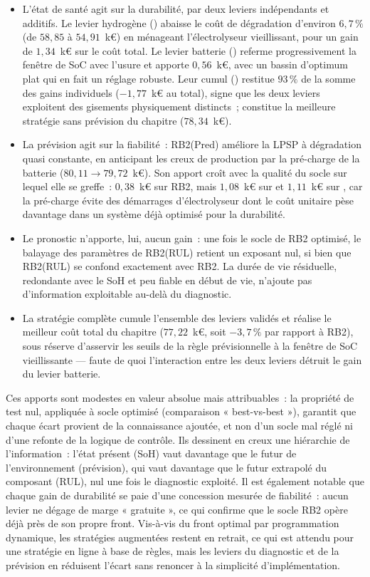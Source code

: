 \begin{itemize}
  \setlength\itemsep{2pt}
  \item L'état de santé agit sur la durabilité, par deux leviers indépendants et additifs. Le levier hydrogène (\RBsohH) abaisse le coût de dégradation d'environ $6{,}7\,\%$ (de $58{,}85$ à $54{,}91$~k€) en ménageant l'électrolyseur vieillissant, pour un gain de $1{,}34$~k€ sur le coût total. Le levier batterie (\RBsohB) referme progressivement la fenêtre de SoC avec l'usure et apporte $0{,}56$~k€, avec un bassin d'optimum plat qui en fait un réglage robuste. Leur cumul (\RBsohA) restitue $93\,\%$ de la somme des gains individuels ($-1{,}77$~k€ au total), signe que les deux leviers exploitent des gisements physiquement distincts~; \RBsohA{} constitue la meilleure stratégie sans prévision du chapitre ($78{,}34$~k€).
  \item La prévision agit sur la fiabilité~: RB2(Pred) améliore la LPSP à dégradation quasi constante, en anticipant les creux de production par la pré-charge de la batterie ($80{,}11 \to 79{,}72$~k€). Son apport croît avec la qualité du socle sur lequel elle se greffe~: $0{,}38$~k€ sur RB2, mais $1{,}08$~k€ sur \RBsohH{} et $1{,}11$~k€ sur \RBsohA, car la pré-charge évite des démarrages d'électrolyseur dont le coût unitaire pèse davantage dans un système déjà optimisé pour la durabilité.
  \item Le pronostic n'apporte, lui, aucun gain~: une fois le socle de RB2 optimisé, le balayage des paramètres de RB2(RUL) retient un exposant nul, si bien que RB2(RUL) se confond exactement avec RB2. La durée de vie résiduelle, redondante avec le SoH et peu fiable en début de vie, n'ajoute pas d'information exploitable au-delà du diagnostic.
  \item La stratégie complète \RBult{} cumule l'ensemble des leviers validés et réalise le meilleur coût total du chapitre ($77{,}22$~k€, soit $-3{,}7\,\%$ par rapport à RB2), sous réserve d'asservir les seuils de la règle prévisionnelle à la fenêtre de SoC vieillissante --- faute de quoi l'interaction entre les deux leviers détruit le gain du levier batterie.
\end{itemize}

Ces apports sont modestes en valeur absolue mais attribuables~: la propriété de test nul, appliquée à socle optimisé (comparaison « best-vs-best »), garantit que chaque écart provient de la connaissance ajoutée, et non d'un socle mal réglé ni d'une refonte de la logique de contrôle. Ils dessinent en creux une hiérarchie de l'information~: l'état présent (SoH) vaut davantage que le futur de l'environnement (prévision), qui vaut davantage que le futur extrapolé du composant (RUL), nul une fois le diagnostic exploité. Il est également notable que chaque gain de durabilité se paie d'une concession mesurée de fiabilité~: aucun levier ne dégage de marge « gratuite », ce qui confirme que le socle RB2 opère déjà près de son propre front. Vis-à-vis du front optimal par programmation dynamique, les stratégies augmentées restent en retrait, ce qui est attendu pour une stratégie en ligne à base de règles, mais les leviers du diagnostic et de la prévision en réduisent l'écart sans renoncer à la simplicité d'implémentation.

